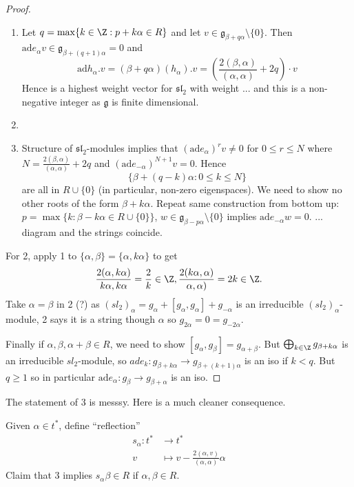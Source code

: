 \documentclass[a4paper]{article}
\newcommand*{\Lie}[1]{\mathfrak{#1}} %
\newcommand{\ad}{\mathrm{ad}} %
\begin{document}
\begin{proof}\leavevmode
  \begin{enumerate}
  \item Let \(q = \max \{k \in \Z: p + k \alpha \in R\}\) and let \(v \in \Lie g_{\beta + q \alpha} \setminus \{0\}\). Then \(\ad e_\alpha v \in \Lie g_{\beta + (q + 1)\alpha} = 0\) and
    \[
      \ad h_\alpha . v = (\beta + q\alpha) (h_\alpha) . v = \left( \frac{2(\beta, \alpha)}{(\alpha, \alpha)} + 2q \right) \cdot v
    \]
    Hence is a highest weight vector for \(\Lie{sl}_2\) with weight ... and this is a non-negative integer as \(\Lie g\) is finite dimensional.
  \item
  \item Structure of \(\Lie{sl}_2\)-modules implies that \((\ad e_{\alpha})^r v \neq 0\) for \(0 \leq r \leq N\) where \(N = \frac{2(\beta, \alpha)}{(\alpha, \alpha)} + 2q\) and \((\ad e_{-\alpha})^{N + 1}v = 0\). Hence
  \[
    \{\beta + (q - k) \alpha: 0 \leq k \leq N\}
  \]
  are all in \(R \cup \{0\}\) (in particular, non-zero eigenspaces). We need to show no other roots of the form \(\beta + k\alpha\). Repeat same construction from bottom up: \(p = \max \{k: \beta - k\alpha \in R \cup \{0\}\}\), \(w \in \Lie g_{\beta - p \alpha} \setminus \{0\}\) implies \(\ad e_{-\alpha} w = 0\).
  ... diagram and the strings coincide.
  \end{enumerate}
  For 2, apply 1 to \(\{\alpha, \beta\} = \{\alpha, k\alpha\}\) to get
  \[
    \frac{2(\alpha, k\alpha)}{k \alpha, k \alpha} = \frac{2}{k} \in \Z, \frac{2(k\alpha, \alpha)}{\alpha, \alpha)} = 2k \in \Z.
  \]
  Take \(\alpha = \beta\) in 2 (?) as \((sl_2)_\alpha = g_\alpha + [g_\alpha, g_\alpha] + g_{-\alpha}\) is an irreducible \((sl_2)_\alpha\)-module, 2 says it is a string though \(\alpha\) so \(g_{2\alpha} = 0 = g_{-2\alpha}\).

  Finally if \(\alpha, \beta, \alpha + \beta \in R\), we need to show \([g_\alpha, g_\beta] = g_{\alpha + \beta}\). But \(\bigoplus_{k \in \Z} g_{\beta + k \alpha}\) is an irreducible \(sl_2\)-module, so \(ad e_k: g_{\beta + k\alpha} \to g_{\beta + (k + 1)\alpha}\) is an iso if \(k < q\). But \(q \geq 1\) so in particular \(\ad e_\alpha: g_\beta \to g_{\beta + \alpha}\) is an iso.
\end{proof}

The statement of 3 is messsy. Here is a much cleaner consequence.

Given \(\alpha \in t^*\), define ``reflection''
\begin{align*}
  s_\alpha: t^* &\to t^* \\
  v &\mapsto v -\frac{2 (\alpha, v)}{(\alpha, \alpha)} \alpha
\end{align*}
Claim that 3 implies \(s_\alpha \beta \in R\) if \(\alpha, \beta \in R\).
\end{document}
